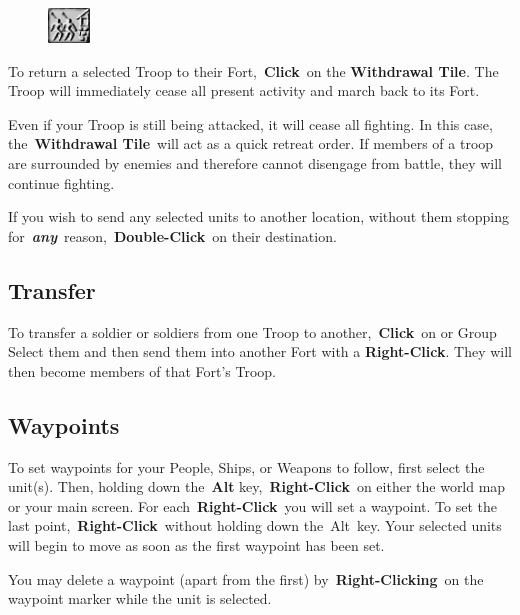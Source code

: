 \begin{figure}
	\vspace{-20pt}
	\begin{center}
		\includegraphics[width=0.1\textwidth]{Twithdrawl}
	\end{center}
	\vspace{-20pt}
\end{figure}

To return a selected Troop to their Fort, \textbf{Click} on the \textbf{Withdrawal Tile}. The Troop will immediately cease all present activity and march back to its Fort.

Even if your Troop is still being attacked, it will cease all fighting. In this case, the \textbf{Withdrawal Tile} will act as a quick retreat order. If members of a troop are surrounded by enemies and therefore cannot disengage from battle, they will continue fighting.

If you wish to send any selected units to another location, without them stopping for \textbf{\textit{any}} reason, \textbf{Double-Click} on their destination.

\subsection{Transfer}

To transfer a soldier or soldiers from one Troop to another, \textbf{Click} on or Group Select them and then send them into another Fort with a \textbf{Right-Click}. They will then become members of that Fort’s Troop.

\subsection{Waypoints}

To set waypoints for your People, Ships, or Weapons to follow, first select the unit(s). Then, holding down the \textbf{Alt} key, \textbf{Right-Click} on either the world map or your main screen. For each \textbf{Right-Click} you will set a waypoint. To set the last point, \textbf{Right-Click} without holding down the Alt key. Your selected units will begin to move as soon as the first waypoint has been set.

You may delete a waypoint (apart from the first) by \textbf{Right-Clicking} on the waypoint marker while the unit is selected.


